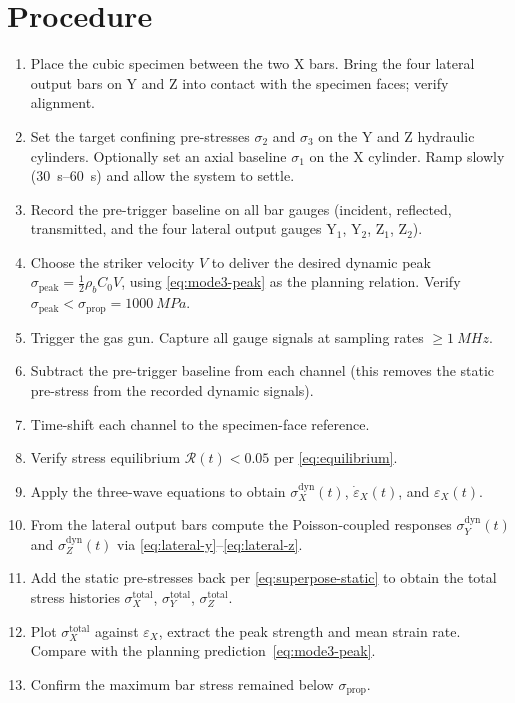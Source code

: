 \documentclass[11pt,a4paper,openany]{book}
\providecommand{\SI}[2]{\qty{#1}{#2}}
\providecommand{\SIrange}[3]{\qtyrange{#1}{#2}{#3}}
\theoremstyle{handbook}
\newcommand{\sig}{\sigma}
\newcommand{\eps}{\varepsilon}
\newcommand{\epsdot}{\dot\eps}
\newcommand{\Cz}{C_0}
\newcommand{\sigprop}{\sig_{\text{prop}}}
\newcommand{\sigpeak}{\sig_{\text{peak}}}
\begin{document}
\section{Procedure}

\begin{stepbox}
\begin{enumerate}[leftmargin=*,itemsep=3pt]
  \item Place the cubic specimen between the two X bars. Bring the four
        lateral output bars on Y and Z into contact with the specimen
        faces; verify alignment.
  \item Set the target confining pre-stresses $\sig_2$ and $\sig_3$ on the
        Y and Z hydraulic cylinders. Optionally set an axial baseline
        $\sig_1$ on the X cylinder. Ramp slowly
        (\SIrange{30}{60}{s}) and allow the system to settle.
  \item Record the pre-trigger baseline on all bar gauges (incident,
        reflected, transmitted, and the four lateral output gauges
        Y$_1$, Y$_2$, Z$_1$, Z$_2$).
  \item Choose the striker velocity $V$ to deliver the desired dynamic
        peak $\sigpeak=\tfrac{1}{2}\rho_b\Cz V$, using \eqref{eq:mode3-peak}
        as the planning relation. Verify $\sigpeak<\sigprop=\SI{1000}{MPa}$.
  \item Trigger the gas gun. Capture all gauge signals at sampling rates
        $\ge\SI{1}{MHz}$.
  \item Subtract the pre-trigger baseline from each channel (this removes
        the static pre-stress from the recorded dynamic signals).
  \item Time-shift each channel to the specimen-face reference.
  \item Verify stress equilibrium $\mathcal{R}(t)<0.05$ per
        \eqref{eq:equilibrium}.
  \item Apply the three-wave equations to obtain $\sig_X^{\text{dyn}}(t)$,
        $\epsdot_X(t)$, and $\eps_X(t)$.
  \item From the lateral output bars compute the Poisson-coupled responses
        $\sig_Y^{\text{dyn}}(t)$ and $\sig_Z^{\text{dyn}}(t)$ via
        \eqref{eq:lateral-y}--\eqref{eq:lateral-z}.
  \item Add the static pre-stresses back per \eqref{eq:superpose-static} to
        obtain the total stress histories $\sig_X^{\text{total}}$,
        $\sig_Y^{\text{total}}$, $\sig_Z^{\text{total}}$.
  \item Plot $\sig_X^{\text{total}}$ against $\eps_X$, extract the peak
        strength and mean strain rate. Compare with the planning
        prediction~\eqref{eq:mode3-peak}.
  \item Confirm the maximum bar stress remained below $\sigprop$.
\end{enumerate}
\end{stepbox}
\end{document}
